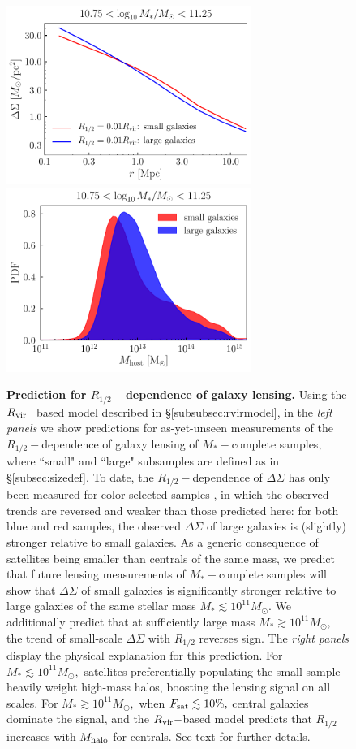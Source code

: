 \documentclass[usenatbib,usegraphicx,letterpaper]{mn2e}
\newcommand{\rhalf}{R_{1/2}}
\newcommand{\mstar}{M_{\ast}}
\newcommand{\mhalo}{M_{\rm halo}}
\newcommand{\rvir}{R_{\rm vir}}
\newcommand{\msun}{M_\odot}
\begin{document}
\begin{figure}
\includegraphics[width=8cm]{FIGS/rvir_only_lensing_prediction3.pdf}
\includegraphics[width=8cm]{FIGS/host_mass_distributions_sm10p75_sm11p25.pdf}
\caption{
{\bf Prediction for $\rhalf-$dependence of galaxy lensing.}
Using the $\rvir-$based model described in \S\ref{subsubsec:rvirmodel}, in the {\em left panels} we show predictions for as-yet-unseen measurements of the $\rhalf-$dependence of galaxy lensing of $\mstar-$complete samples, where ``small" and ``large" subsamples are defined as in \S\ref{subsec:sizedef}. To date, the $\rhalf-$dependence of $\Delta\Sigma$ has only been measured for color-selected samples \citep{charlton_etal17}, in which the observed trends are reversed and weaker than those predicted here: for both blue and red samples, the observed $\Delta\Sigma$ of large galaxies is (slightly) stronger relative to small galaxies. As a generic consequence of satellites being smaller than centrals of the same mass, we predict that future lensing measurements of $\mstar-$complete samples will show that $\Delta\Sigma$ of small galaxies is significantly stronger relative to large galaxies of the same stellar mass $\mstar\lesssim10^{11}\msun.$ We additionally predict that at sufficiently large mass $\mstar\gtrsim10^{11}\msun,$ the trend of small-scale $\Delta\Sigma$ with $\rhalf$ reverses sign. The {\em right panels} display the physical explanation for this prediction. For $\mstar\lesssim10^{11}\msun,$ satellites preferentially populating the small sample heavily weight high-mass halos, boosting the lensing signal on all scales. For $\mstar\gtrsim10^{11}\msun,$ when $F_{\rm sat}\lesssim10\%,$ central galaxies dominate the signal, and the $\rvir-$based model predicts that $\rhalf$ increases with $\mhalo$ for centrals. See text for further details. 
}
\label{fig:lensingprediction}
\end{figure}
\end{document}

